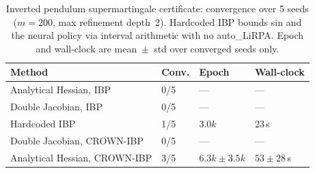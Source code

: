 \begin{table}[H]
\centering
\caption{Inverted pendulum supermartingale certificate: convergence over 5 seeds ($m=200$, max refinement depth~2). Hardcoded IBP bounds sin and the neural policy via interval arithmetic with no auto\_LiRPA. Epoch and wall-clock are mean~$\pm$~std over converged seeds only.}
\label{tab:pendulum_comparison}
\begin{tabular}{llll}
\toprule
Method & Conv. & Epoch & Wall-clock \\
\midrule
Analytical Hessian, IBP & 0/5 & --- & --- \\
Double Jacobian, IBP & 0/5 & --- & --- \\
Hardcoded IBP & 1/5 & $3.0k$ & $23$\,s \\
Double Jacobian, CROWN-IBP & 0/5 & --- & --- \\
Analytical Hessian, CROWN-IBP & 3/5 & $6.3k \pm 3.5k$ & $53 \pm 28$\,s \\
\bottomrule
\end{tabular}
\end{table}
